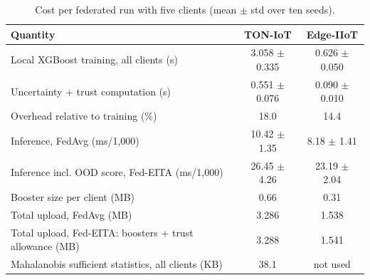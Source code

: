 \documentclass[pdflatex,sn-mathphys-num]{sn-jnl}
\begin{document}
{{{\begin{table}[!htbp]\centering
\color{black}
\caption{Cost per federated run with five clients (mean $\pm$ std over ten seeds).}\label{tab:cost}
\footnotesize
\setlength{\tabcolsep}{4pt}
\begin{tabular}{lcc}\toprule
Quantity & TON-IoT & Edge-IIoT \\ \midrule
Local XGBoost training, all clients (s) & 3.058 $\pm$ 0.335 & 0.626 $\pm$ 0.050 \\
Uncertainty + trust computation (s) & 0.551 $\pm$ 0.076 & 0.090 $\pm$ 0.010 \\
Overhead relative to training (\%) & 18.0 & 14.4 \\
Inference, FedAvg (ms/1,000) & 10.42 $\pm$ 1.35 & 8.18 $\pm$ 1.41 \\
Inference incl. OOD score, Fed-EITA (ms/1,000) & 26.45 $\pm$ 4.26 & 23.19 $\pm$ 2.04 \\
Booster size per client (MB) & 0.66 & 0.31 \\
Total upload, FedAvg (MB) & 3.286 & 1.538 \\
Total upload, Fed-EITA: boosters + trust allowance (MB) & 3.288 & 1.541 \\
Mahalanobis sufficient statistics, all clients (KB) & 38.1 & not used \\
\bottomrule\end{tabular}
\end{table}

}}}
\end{document}

